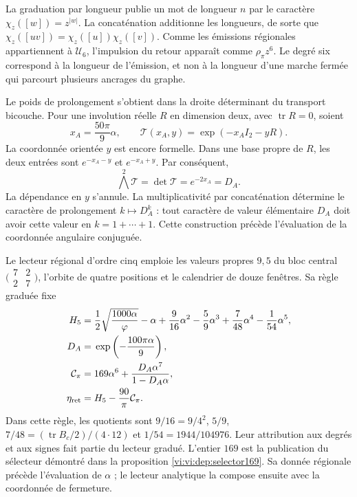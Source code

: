 La graduation par longueur publie un mot de longueur \(n\)
par le caractère \(\chi_z([w])=z^{|w|}\). La concaténation
additionne les longueurs, de sorte que
\(\chi_z([uv])=\chi_z([u])\chi_z([v])\). Comme les émissions
régionales appartiennent à \(\mathcal U_6\), l'impulsion du retour
apparaît comme \(\rho_\pi z^6\). Le degré six correspond à la
longueur de l'émission, et non à la longueur d'une marche fermée qui
parcourt plusieurs ancrages du graphe.

Le poids de prolongement s’obtient dans la droite déterminant du
transport bicouche. Pour une involution réelle \(R\) en dimension deux,
avec \(\operatorname{tr}R=0\), soient
\[
 x_A=\frac{50\pi}{9}\alpha,\qquad
 \mathcal T(x_A,y)=\exp(-x_AI_2-yR).
\]
La coordonnée orientée \(y\) est encore formelle. Dans une base propre
de \(R\), les deux entrées sont \(e^{-x_A-y}\) et
\(e^{-x_A+y}\). Par conséquent,
\[
 \bigwedge^2\mathcal T=\det\mathcal T
 =e^{-2x_A}=D_A.
\]
La dépendance en \(y\) s’annule. La multiplicativité par
concaténation détermine le caractère de prolongement \(k\mapsto D_A^k\) :
tout caractère de valeur élémentaire \(D_A\) doit avoir cette valeur
en \(k=1+\cdots+1\). Cette construction précède l’évaluation
de la coordonnée angulaire conjuguée.

Le lecteur régional d’ordre cinq emploie les valeurs propres \(9,5\)
du bloc central \(\bigl(\begin{smallmatrix}7&2\\2&7\end{smallmatrix}\bigr)\),
l’orbite de quatre positions et le calendrier de douze fenêtres.
Sa règle graduée fixe
\begin{align}
 H_5={}&\frac12\sqrt{\frac{1000\alpha}{\varphi}}-\alpha
       +\frac9{16}\alpha^2-\frac59\alpha^3
       +\frac7{48}\alpha^4-\frac1{54}\alpha^5,\notag\\
 D_A={}&\exp\left(-\frac{100\pi\alpha}{9}\right),\notag\\
 \mathcal C_\pi={}&169\alpha^6+
                  \frac{D_A\alpha^7}{1-D_A\alpha},\notag\\
 \eta_{\rm ret}={}&H_5-\frac{90}{\pi}\mathcal C_\pi.
 \label{vi:vi:dep:mantisas}
\end{align}
Dans cette règle, les quotients sont
\(9/16=9/4^2\), \(5/9\), \(7/48=(\operatorname{tr}B_c/2)/(4\cdot12)\)
et \(1/54=1944/104976\). Leur attribution aux degrés et aux signes
fait partie du lecteur gradué. L'entier \(169\) est la publication
du sélecteur démontré dans la proposition \ref{vi:vi:dep:selector169}.
Sa donnée régionale précède l'évaluation de \(\alpha\) ; le
lecteur analytique la compose ensuite avec la coordonnée de fermeture.

